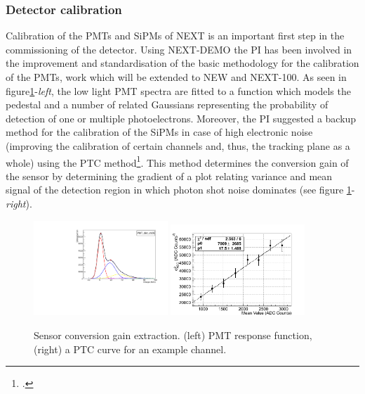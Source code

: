 \documentclass[a4paper,11pt,oneside]{article}
\begin{document}
\subsubsection*{Detector calibration}
Calibration of the PMTs and SiPMs of NEXT is an important first step
in the commissioning of the detector. Using NEXT-DEMO the PI has been
involved in the improvement and standardisation of the basic
methodology for the calibration of the PMTs, work which will be
extended to NEW and NEXT-100. As seen in figure\ref{fig:cal}-\emph{left}, the low light
PMT spectra are fitted to a function which models the pedestal and a
number of related Gaussians representing the probability of detection
of one or multiple photoelectrons. Moreover, the PI suggested a backup
method for the calibration of the SiPMs in case of high electronic
noise (improving the calibration of certain channels and, thus, the
tracking plane as a whole) using the PTC
method\footcite{Janesick:2001}. This method determines the conversion
gain of the sensor by determining the gradient of a plot relating
variance and mean signal of the detection region
in which photon shot noise dominates (see figure \ref{fig:cal}-\emph{right}).
\begin{figure}
  \begin{center}
    \includegraphics[width=0.45\textwidth]{img/pmtFitEx}
    \includegraphics[width=0.45\textwidth]{img/Silinfit.png}
  \end{center}
  \caption{Sensor conversion gain extraction. (left) PMT response
    function, (right) a PTC curve for an example channel.}
  \label{fig:cal}
\end{figure}
\end{document}
